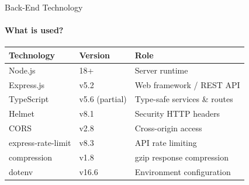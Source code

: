\documentclass[aspectratio=169, 12pt]{beamer}
\begin{document}

\begin{frame}{Back-End Technology}
\framesubtitle{What is used?}

\begin{center}
\begin{tabular}{l l l}
\toprule
\textbf{Technology} & \textbf{Version} & \textbf{Role} \\
\midrule
Node.js & 18+ & Server runtime \\
Express.js & v5.2 & Web framework / REST API \\
TypeScript & v5.6 (partial) & Type-safe services \& routes \\
Helmet & v8.1 & Security HTTP headers \\
CORS & v2.8 & Cross-origin access \\
express-rate-limit & v8.3 & API rate limiting \\
compression & v1.8 & gzip response compression \\
dotenv & v16.6 & Environment configuration \\
\bottomrule
\end{tabular}
\end{center}
\end{frame}
\end{document}
